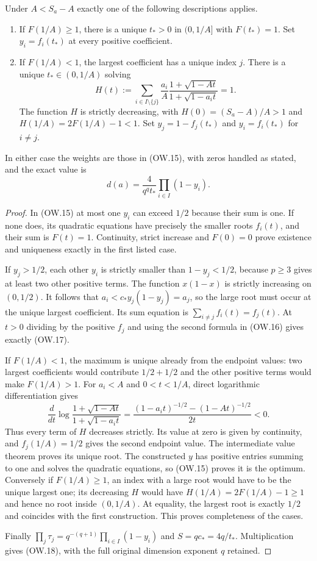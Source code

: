 \begin{theorem}
Under $A<S_a-A$ exactly one of the following descriptions applies.
\begin{enumerate}
\item If $F(1/A)\ge1$, there is a unique $t_*>0$ in $(0,1/A]$
with $F(t_*)=1$. Set $y_i=f_i(t_*)$ at every positive coefficient.
\item If $F(1/A)<1$, the largest coefficient has a unique index $j$.
There is a unique $t_*\in(0,1/A)$ solving
\[
 H(t):=\sum_{i\in I\setminus\{j\}}\frac{a_i}{A}
   \frac{1+\sqrt{1-At}}{1+\sqrt{1-a_it}}=1.               \tag{OW.17}
\]
The function $H$ is strictly decreasing, with
$H(0)=(S_a-A)/A>1$ and $H(1/A)=2F(1/A)-1<1$.
Set $y_j=1-f_j(t_*)$ and $y_i=f_i(t_*)$ for $i\ne j$.
\end{enumerate}
In either case the weights are those in (OW.15), with zeros handled
as stated, and the exact value is
\[
 \boxed{d(a)=\frac{4}{q^qt_*}\prod_{i\in I}(1-y_i).}     \tag{OW.18}
\]
\end{theorem}
\begin{proof}
In (OW.15) at most one $y_i$ can exceed $1/2$ because their sum
is one. If none does, its quadratic equations have precisely the
smaller roots $f_i(t)$, and their sum is $F(t)=1$.
Continuity, strict increase and $F(0)=0$ prove existence and
uniqueness exactly in the first listed case.

If $y_j>1/2$, each other $y_i$ is strictly smaller than
$1-y_j<1/2$, because $p\ge3$ gives at least two other positive
terms. The function $x(1-x)$ is strictly increasing on $(0,1/2)$.
It follows that $a_i<c_*y_j(1-y_j)=a_j$, so the large root must
occur at the unique largest coefficient. Its sum equation is
$\sum_{i\ne j}f_i(t)=f_j(t)$. At $t>0$ dividing by the positive
$f_j$ and using the second formula in (OW.16) gives exactly (OW.17).

If $F(1/A)<1$, the maximum is unique already from the endpoint
values: two largest coefficients would contribute $1/2+1/2$ and
the other positive terms would make $F(1/A)>1$.
For $a_i<A$ and $0<t<1/A$, direct logarithmic differentiation gives
\[
 \frac d{dt}\log\frac{1+\sqrt{1-At}}{1+\sqrt{1-a_it}}
  =\frac{(1-a_it)^{-1/2}-(1-At)^{-1/2}}{2t}<0.
 \tag{OW.19}
\]
Thus every term of $H$ decreases strictly. Its value at zero is
given by continuity, and $f_j(1/A)=1/2$ gives the second endpoint
value. The intermediate value theorem proves its unique root.
The constructed $y$ has positive entries summing to one and solves
the quadratic equations, so (OW.15) proves it is the optimum.
Conversely if $F(1/A)\ge1$, an index with a large root would
have to be the unique largest one; its decreasing $H$ would have
$H(1/A)=2F(1/A)-1\ge1$ and hence no root inside $(0,1/A)$.
At equality, the largest root is exactly $1/2$ and coincides with
the first construction. This proves completeness of the cases.

Finally $\prod_j\tau_j=q^{-(q+1)}\prod_{i\in I}(1-y_i)$
and $S=q c_*=4q/t_*$. Multiplication gives (OW.18), with the
full original dimension exponent $q$ retained.
\end{proof}

